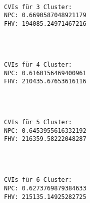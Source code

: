 \documentclass[12pt]{article}
\begin{document}
    \begin{Verbatim}[commandchars=\\\{\}]

CVIs für 3 Cluster:
NPC: 0.6690587048921179
FHV: 194085.24971467216

    \end{Verbatim}

    \begin{center}
    \end{center}
    { \hspace*{\fill} \\}
    
    \begin{Verbatim}[commandchars=\\\{\}]

CVIs für 4 Cluster:
NPC: 0.6160156469400961
FHV: 210435.67653616116

    \end{Verbatim}

    \begin{center}
    \end{center}
    { \hspace*{\fill} \\}
    
    \begin{Verbatim}[commandchars=\\\{\}]

CVIs für 5 Cluster:
NPC: 0.6453955616332192
FHV: 216359.58222048287

    \end{Verbatim}

    \begin{center}
    \end{center}
    { \hspace*{\fill} \\}
    
    \begin{Verbatim}[commandchars=\\\{\}]

CVIs für 6 Cluster:
NPC: 0.6273769879384633
FHV: 215135.14925282725

    \end{Verbatim}

    \begin{center}
    \end{center}
    { \hspace*{\fill} \\}
    
\end{document}
